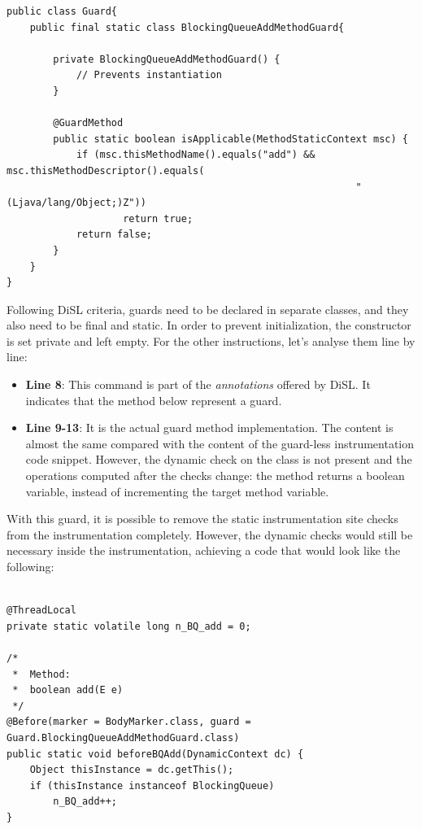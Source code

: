 \documentclass[]{usiinfthesis}
\begin{document}
\vspace*{0.5cm}
\begin{verbatim}
public class Guard{
    public final static class BlockingQueueAddMethodGuard{
    
        private BlockingQueueAddMethodGuard() {
            // Prevents instantiation
        }
    
        @GuardMethod
        public static boolean isApplicable(MethodStaticContext msc) {
            if (msc.thisMethodName().equals("add") && msc.thisMethodDescriptor().equals(
                                                            "(Ljava/lang/Object;)Z"))
                    return true;
            return false;
        }
    }
}
\end{verbatim}

\vspace*{0.5cm}

\noindent
Following DiSL criteria, guards need to be declared in separate classes, and they also need to be final and static. In order to prevent initialization, the constructor is set private and left empty. For the other instructions, let's analyse them line by line:


\begin{itemize}
    \item \textbf{Line 8}: This command is part of the \textit{annotations} offered by DiSL. It indicates that the method below represent a guard.
    
    \item \textbf{Line 9-13}: It is the actual guard method implementation. The content is almost the same compared with the content of the guard-less instrumentation code snippet. However, the dynamic check on the class is not present and the operations computed after the checks change: the method returns a boolean variable, instead of incrementing the target method variable.
\end{itemize}

\noindent
With this guard, it is possible to remove the static instrumentation site checks from the instrumentation completely. However, the dynamic checks would still be necessary inside the instrumentation, achieving a code that would look like the following:


\vspace*{0.5cm}
\begin{verbatim}

@ThreadLocal
private static volatile long n_BQ_add = 0;

/*
 *  Method:
 *  boolean add(E e)
 */
@Before(marker = BodyMarker.class, guard = Guard.BlockingQueueAddMethodGuard.class)
public static void beforeBQAdd(DynamicContext dc) {
    Object thisInstance = dc.getThis();
    if (thisInstance instanceof BlockingQueue)
        n_BQ_add++;
}
\end{verbatim}
\end{document}
